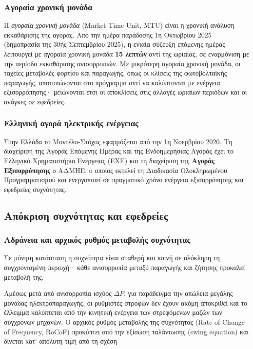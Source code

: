 \subsubsection*{Αγοραία χρονική μονάδα}

Η \emph{αγοραία χρονική μονάδα} (Market Time Unit, MTU) είναι η χρονική ανάλυση εκκαθάρισης
της αγοράς. Από την ημέρα παράδοσης 1η Οκτωβρίου 2025 (δημοπρασία της 30ής Σεπτεμβρίου
2025), η ενιαία σύζευξη επόμενης ημέρας λειτουργεί με αγοραία χρονική μονάδα \textbf{15
λεπτών} αντί της ωριαίας, σε εναρμόνιση με την περίοδο εκκαθάρισης ανισορροπιών. Με
μικρότερη αγοραία χρονική μονάδα, οι ταχείες μεταβολές φορτίου και παραγωγής, όπως οι
κλίσεις της φωτοβολταϊκής παραγωγής, αποτυπώνονται στο πρόγραμμα αντί να καλύπτονται με
ενέργεια εξισορρόπησης· μειώνονται έτσι οι αποκλίσεις στις αλλαγές ωριαίων περιόδων και οι
ανάγκες σε εφεδρείες.

\subsubsection*{Ελληνική αγορά ηλεκτρικής ενέργειας}

Στην Ελλάδα το Μοντέλο-Στόχος εφαρμόζεται από την 1η Νοεμβρίου 2020. Τη διαχείριση της
Αγοράς Επόμενης Ημέρας και της Ενδοημερήσιας Αγοράς έχει το Ελληνικό Χρηματιστήριο Ενέργειας
(ΕΧΕ) και τη διαχείριση της \textbf{Αγοράς Εξισορρόπησης} ο ΑΔΜΗΕ, ο οποίος εκτελεί τη
Διαδικασία Ολοκληρωμένου Προγραμματισμού και ενεργοποιεί σε πραγματικό χρόνο ενέργεια
εξισορρόπησης και εφεδρείες συχνότητας.

\subsection{Απόκριση συχνότητας και εφεδρείες}

\subsubsection*{Αδράνεια και αρχικός ρυθμός μεταβολής συχνότητας}

Σε μόνιμη κατάσταση η συχνότητα είναι σταθερή και κοινή σε ολόκληρη τη συγχρονισμένη
περιοχή· κάθε ανισορροπία μεταξύ παραγωγής και ζήτησης προκαλεί μεταβολή της.

Αμέσως μετά από ανισορροπία ισχύος $\Delta P$, για παράδειγμα την απώλεια μεγάλης μονάδας
ηλεκτροπαραγωγής, οι ρυθμιστές στροφών δεν έχουν ακόμη αποκριθεί και το έλλειμμα καλύπτεται
από την κινητική ενέργεια των στρεφόμενων μαζών των σύγχρονων μηχανών. Ο αρχικός ρυθμός
μεταβολής της συχνότητας (Rate of Change of Frequency, RoCoF) προκύπτει από την εξίσωση
ταλάντωσης (swing equation) και δίνεται κατ' απόλυτη τιμή από τη σχέση

